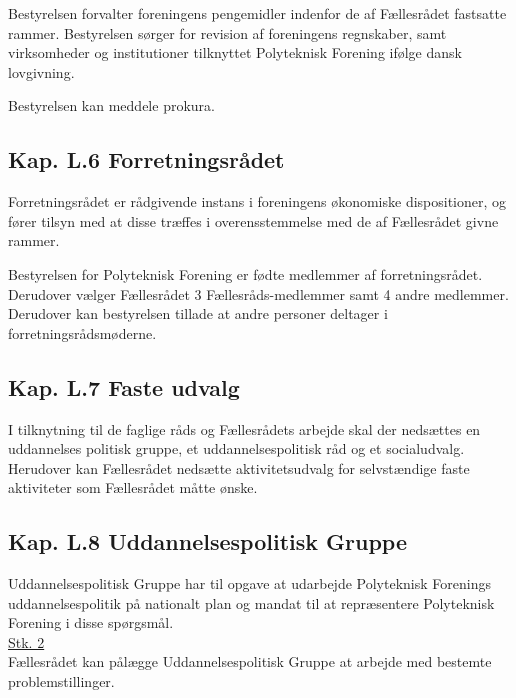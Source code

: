 \item Bestyrelsen forvalter foreningens pengemidler indenfor de af Fællesrådet fastsatte rammer. Bestyrelsen sørger for revision af foreningens regnskaber, samt virksomheder og institutioner tilknyttet Polyteknisk Forening ifølge dansk lovgivning.

\item Bestyrelsen kan meddele prokura.

\subsection*{Kap. L.6 Forretningsrådet}
\item Forretningsrådet er rådgivende instans i foreningens økonomiske dispositioner, og fører tilsyn med at disse træffes i overensstemmelse med de af Fællesrådet givne rammer.\\

\item Bestyrelsen for Polyteknisk Forening er fødte medlemmer af forretningsrådet. Derudover vælger Fællesrådet 3 Fællesråds-medlemmer samt 4 andre medlemmer. Derudover kan bestyrelsen tillade at andre personer deltager i forretningsrådsmøderne.

\subsection*{Kap. L.7 Faste udvalg}
\item I tilknytning til de faglige råds og Fællesrådets arbejde skal der nedsættes en uddannelses politisk gruppe, et uddannelsespolitisk råd og et socialudvalg. Herudover kan Fællesrådet nedsætte aktivitetsudvalg for selvstændige faste aktiviteter som Fællesrådet måtte ønske.\\

\subsection*{Kap. L.8 Uddannelsespolitisk Gruppe}
\item Uddannelsespolitisk Gruppe har til opgave at udarbejde Polyteknisk Forenings uddannelsespolitik på nationalt plan og mandat til at repræsentere Polyteknisk Forening i disse spørgsmål.\\

\underline{Stk. 2}\\
Fællesrådet kan pålægge Uddannelsespolitisk Gruppe at arbejde med bestemte problemstillinger.\\

